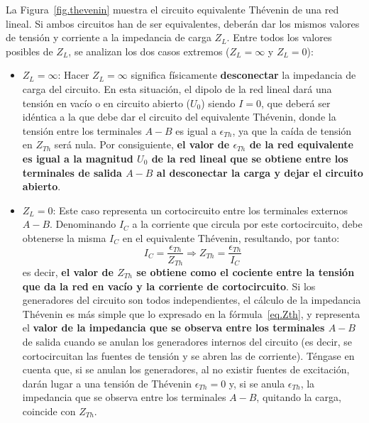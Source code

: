 \documentclass[11pt]{book} %
\numberwithin{dummy}{section}
\theoremstyle{ocrenumbox}
\theoremstyle{blacknumex}
\theoremstyle{blacknumbox}
\theoremstyle{ocrenum}
\begin{document}
     La Figura~\ref{fig.thevenin} muestra el circuito equivalente Thévenin de una red lineal. Si ambos circuitos han de ser equivalentes, deberán dar los mismos valores de tensión y corriente a la impedancia de carga $Z_L$. Entre todos los valores posibles de $Z_L$, se analizan los dos casos extremos ($Z_L=\infty$ y $Z_L=0$):
     \begin{itemize}
         \item $Z_L=\infty$: Hacer $Z_L=\infty$ significa físicamente \textbf{desconectar} la impedancia de carga del circuito. En esta situación, el dipolo de la red lineal dará una tensión en vacío o en circuito abierto ($U_0$) siendo $I=0$, que deberá ser idéntica a la que debe dar el circuito del equivalente Thévenin, donde la tensión entre los terminales $A-B$ es igual a $\epsilon_{Th}$, ya que la caída de tensión en $Z_{Th}$ será nula. Por consiguiente, \textbf{el valor de $\epsilon_{Th}$ de la red equivalente es igual a la magnitud $U_0$ de la red lineal que se obtiene entre los terminales de salida $A-B$ al desconectar la carga y dejar el circuito abierto}.
         \item $Z_L=0$: Este caso representa un cortocircuito entre los terminales externos $A-B$. Denominando $I_C$ a la corriente que circula por este cortocircuito, debe obtenerse la misma $I_C$ en el equivalente Thévenin, resultando, por tanto:
         \begin{equation}\label{eq.Zth} I_C=\dfrac{\epsilon_{Th}}{Z_{Th}}\Rightarrow \boxed{Z_{Th}=\dfrac{\epsilon_{Th}}{I_C}}
         \end{equation}
         es decir, \textbf{el valor de $Z_{Th}$ se obtiene como el cociente entre la tensión que da la red en vacío y la corriente de cortocircuito}. Si los generadores del circuito son todos independientes, el cálculo de la impedancia Thévenin es más simple que lo expresado en la fórmula~\eqref{eq.Zth}, y representa el \textbf{valor de la impedancia que se observa entre los terminales $A-B$} de salida cuando se anulan los generadores internos del circuito (es decir, se cortocircuitan las fuentes de tensión y se abren las de corriente). Téngase en cuenta que, si se anulan los generadores, al no existir fuentes de excitación, darán lugar a una tensión de Thévenin $\epsilon_{Th}=0$ y, si se anula $\epsilon_{Th}$, la impedancia que se observa entre los terminales $A-B$, quitando la carga, coincide con $Z_{Th}$. 
     \end{itemize}
     
\end{document}
